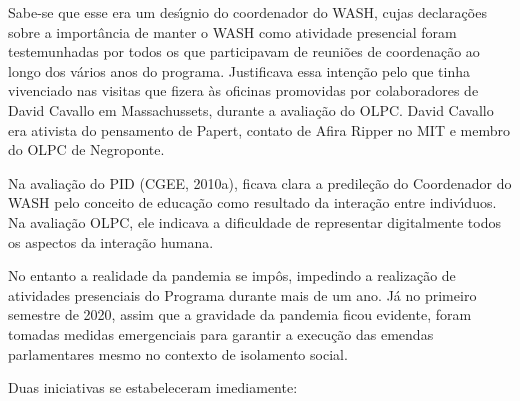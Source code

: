 \documentclass[
12pt,		%
openright,	%
twoside,  %
a4paper,			%
chapter=TITLE,		%
english,			%
french,				%
spanish,			%
brazil				%
]{USPSC-classe/USPSC}
\begin{document}
Sabe-se que esse era um des\'{\i}gnio do coordenador do WASH, cujas declara\c{c}\~oes sobre a import\^ancia de manter o WASH como atividade presencial foram testemunhadas por todos os que participavam de reuni\~oes de coordena\c{c}\~ao ao longo dos v\'arios anos do programa. Justificava essa inten\c{c}\~ao pelo que tinha vivenciado nas visitas que fizera \`as oficinas promovidas por colaboradores de David Cavallo em Massachussets, durante a avalia\c{c}\~ao do OLPC. David Cavallo era ativista do pensamento de Papert, contato de Afira Ripper no MIT e membro do OLPC de Negroponte.

















Na avalia\c{c}\~ao do PID  (CGEE, 2010a), ficava clara a predile\c{c}\~ao do Coordenador do WASH pelo conceito de educa\c{c}\~ao como resultado da intera\c{c}\~ao entre indiv\'{\i}duos. Na avalia\c{c}\~ao OLPC, ele indicava a dificuldade de representar digitalmente todos os aspectos da intera\c{c}\~ao humana.

















No entanto a realidade da pandemia se imp\^os, impedindo a realiza\c{c}\~ao de atividades presenciais do Programa durante mais de um ano. J\'a no primeiro semestre de 2020, assim que a gravidade da pandemia ficou evidente, foram tomadas medidas emergenciais para garantir a execu\c{c}\~ao das emendas parlamentares mesmo no contexto de isolamento social.

















Duas iniciativas se estabeleceram imediamente:
\end{document}
